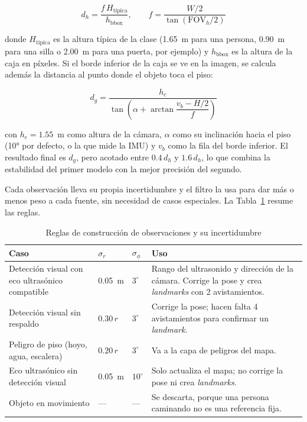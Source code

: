 \[
d_{h} = \frac{f \, H_{\text{típica}}}{h_{\text{bbox}}},
\qquad
f = \frac{W/2}{\tan(\text{FOV}_h/2)}
\]

donde $H_{\text{típica}}$ es la altura típica de la clase (1.65~m para una persona,
0.90~m para una silla o 2.00~m para una puerta, por ejemplo) y $h_{\text{bbox}}$ es la
altura de la caja en píxeles. Si el borde inferior de la caja se ve en la imagen, se
calcula además la distancia al punto donde el objeto toca el piso:

\[
d_{g} = \frac{h_{c}}{\tan\!\left(\alpha + \arctan\dfrac{v_b - H/2}{f}\right)}
\]

con $h_c = 1.55$~m como altura de la cámara, $\alpha$ como su inclinación hacia el piso
(10° por defecto, o la que mide la IMU) y $v_b$ como la fila del borde inferior. El
resultado final es $d_g$, pero acotado entre $0.4\,d_h$ y $1.6\,d_h$, lo que combina la
estabilidad del primer modelo con la mejor precisión del segundo.

Cada observación lleva su propia incertidumbre y el filtro la usa para dar más o menos
peso a cada fuente, sin necesidad de casos especiales. La Tabla~\ref{tab:slam_fusion}
resume las reglas.

\begin{table}[H]
\centering
\caption{Reglas de construcción de observaciones y su incertidumbre}
\label{tab:slam_fusion}
\renewcommand{\arraystretch}{1.25}
\begin{tabular}{|p{4.3cm}|p{2.4cm}|p{1.6cm}|p{5.9cm}|}
\hline
\textbf{Caso} & $\sigma_r$ & $\sigma_\phi$ & \textbf{Uso} \\
\hline
Detección visual con eco ultrasónico compatible & 0.05~m & $3^\circ$ & Rango del
ultrasonido y dirección de la cámara. Corrige la pose y crea \emph{landmarks} con 2
avistamientos. \\
\hline
Detección visual sin respaldo & $0.30\,r$ & $3^\circ$ & Corrige la pose; hacen falta 4
avistamientos para confirmar un \emph{landmark}. \\
\hline
Peligro de piso (hoyo, agua, escalera) & $0.20\,r$ & $3^\circ$ & Va a la capa de
peligros del mapa. \\
\hline
Eco ultrasónico sin detección visual & 0.05~m & $10^\circ$ & Solo actualiza el mapa;
no corrige la pose ni crea \emph{landmarks}. \\
\hline
Objeto en movimiento & --- & --- & Se descarta, porque una persona caminando no es una
referencia fija. \\
\hline
\end{tabular}
\end{table}

